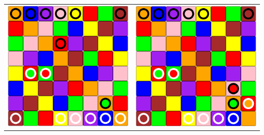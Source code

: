 \documentclass[a4paper, 11pt]{beamer}
\begin{document}
\begin{frame}
\begin{table}[htbp]
\begin{tabular}{c c}
    \includegraphics[scale = 0.11]{mathieu_2.png} & \includegraphics[scale = 0.11]{mathieu_3.png} \\

\end{tabular}
\end{table}
\end{frame}
\end{document}
